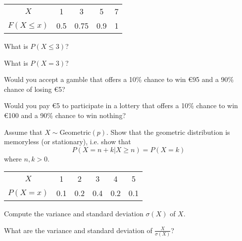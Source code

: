 \documentclass[10pt, a5paper]{scrartcl}
\begin{document}
\boardquestions

\begin{exercise}
  \begin{tabular}{c c c c c }
    \toprule
    $X$ 			& 1		& 3		& 5		& 7 \\
    $F(X \leq x)$	& 0.5	& 0.75	& 0.9	& 1 \\
    \bottomrule
  \end{tabular}
  
  \begin{subex}
  	What is $ P(X \leq 3) $?	
  \end{subex}
  
  \begin{subex}
    What is $ P(X = 3) $?	
  \end{subex}
\end{exercise}


\begin{exercise}[Expectations]
  
  \begin{subex}
    Would you accept a gamble that offers a 10\% chance to win \euro95 and a
    90\% chance of losing \euro5?
  \end{subex}
  
  \begin{subex}
    Would you pay \euro5 to participate in a lottery that offers a 10\% chance
    to win \euro100 and a 90\% chance to win nothing?
  \end{subex}
\end{exercise}


\begin{exercise}[Memorylessness]
  Assume that $ X \sim \text{Geometric}(p) $. Show that the geometric
  distribution is memoryless (or stationary), i.e. show that
  \[
    P(X = n + k | X \geq n) = P(X = k)
  \]
  where $ n,k > 0 $.
\end{exercise}


\begin{exercise}[Variance]
  \begin{tabular}{c c c c c c}
    \toprule
    $ X $		& 1		&2		& 3		& 4		& 5	\\
    $P(X = x)$	& 0.1 	& 0.2	& 0.4	& 0.2	& 0.1 \\
    \bottomrule
  \end{tabular}
  
  \begin{subex}
    Compute the variance and standard deviation $ \sigma(X) $ of $ X $.
  \end{subex}

  \begin{subex}
    What are the variance and standard deviation of $ \frac{X}{\sigma(X)}$?
  \end{subex}
\end{exercise}


\vfill\creditsboardquestions
\end{document}

